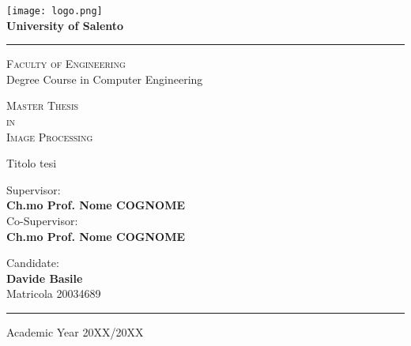 

\linespread{1.5}

\begin{titlepage}
 
\begin{center}
 
\texttt{[image: logo.png]}
\\
\vspace{.3cm}
\textbf{\Large University of Salento}
\vspace{.2cm}
\hrule

\begin{center}
	\doublespacing
	\textsc{\Large Faculty of Engineering} \\

	\textmd{\Large Degree Course in Computer Engineering}
	
	\vspace{1cm} 
	\textsc{\Large Master Thesis} \\
	\textsc{\Large in} \\
	\textsc{\Large Image Processing}	
	\vspace{2.3cm}
	
	\Huge \doublespacing \bfseries \begin{spacing}{1}{Titolo tesi}\end{spacing}
\end{center}
 
\hfill
\vspace{2.5cm}

\begin{flushleft}
	\begin{minipage}[c]{.55\textwidth}
		\singlespacing
		\fontsize{12}{12} \textmd{Supervisor:} \\
		\fontsize{14.4}{12} \textbf{Ch.mo Prof. Nome COGNOME} \\
		\fontsize{12}{12} \textmd{Co-Supervisor:} \\
		\fontsize{14.4}{12} \textbf{Ch.mo Prof. Nome COGNOME}
	\end{minipage}%
	\hspace{10mm}%
	\begin{minipage}[c]{.35\textwidth}
		\bigskip
		\bigskip
		\singlespacing
		\fontsize{12}{12} \textmd{Candidate:} \\
		\fontsize{14.4}{12} \textbf{Davide Basile} \\
		\fontsize{12}{12} \textmd{Matricola 20034689} \\
	\end{minipage}
\end{flushleft}

\vfill
\hfill

\vspace{.25cm}
\hrule
\vspace{.25cm}
{\small Academic Year 20XX/20XX} 
\end{center}
\clearpage
\end{titlepage}

\restoregeometry
